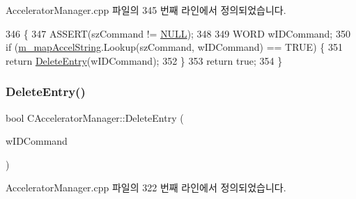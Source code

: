 Accelerator\+Manager.\+cpp 파일의 345 번째 라인에서 정의되었습니다.


\begin{DoxyCode}
346 \{
347   ASSERT(szCommand != \mbox{\hyperlink{getopt1_8c_a070d2ce7b6bb7e5c05602aa8c308d0c4}{NULL}});
348 
349   WORD wIDCommand;
350   \textcolor{keywordflow}{if} (\mbox{\hyperlink{class_c_accelerator_manager_abb40dbb1a44c47ac22590e8f1243835b}{m\_mapAccelString}}.Lookup(szCommand, wIDCommand) == TRUE) \{
351     \textcolor{keywordflow}{return} \mbox{\hyperlink{class_c_accelerator_manager_ae20cd0e0259b70fe7443b442e85d1213}{DeleteEntry}}(wIDCommand);
352   \}
353   \textcolor{keywordflow}{return} \textcolor{keyword}{true};
354 \}
\end{DoxyCode}
\mbox{\label{class_c_accelerator_manager_a25f2470050bd966a2f45235381dda32b}} 
\subsubsection{\texorpdfstring{Delete\+Entry()}{DeleteEntry()}\hspace{0.1cm}{\footnotesize\ttfamily [2/2]}}
{\footnotesize\ttfamily bool C\+Accelerator\+Manager\+::\+Delete\+Entry (\begin{DoxyParamCaption}\item[{W\+O\+RD}]{w\+I\+D\+Command }\end{DoxyParamCaption})}



Accelerator\+Manager.\+cpp 파일의 322 번째 라인에서 정의되었습니다.


